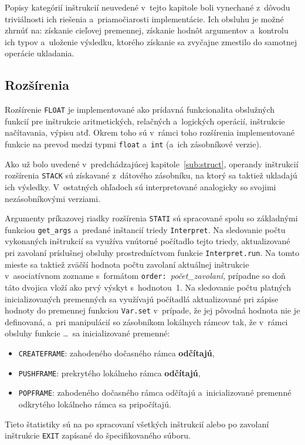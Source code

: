 \documentclass[a4paper, 10pt, twocolumn]{article}
\begin{document}
        Popisy kategórií inštrukcií neuvedené v~tejto kapitole boli vynechané z~dôvodu triviálnosti ich riešenia a~priamočiarosti implementácie. Ich obsluhu je možné zhrnúť na: získanie cieľovej premennej, získanie hodnôt argumentov a~kontrolu ich typov a~uloženie výsledku, ktorého získanie sa zvyčajne zmestilo do samotnej operácie ukladania.
    
    \subsection{Rozšírenia}
        Rozšírenie \texttt{FLOAT} je implementované ako prídavná funkcionalita obslužných funkcií pre inštrukcie aritmetických, relačných a~logických operácií, inštrukcie načítavania, výpisu atď. Okrem toho sú v~rámci toho rozšírenia implementované funkcie na prevod medzi typmi \texttt{float} a~\texttt{int} (a~ich zásobníkové verzie).
        
        Ako už bolo uvedené v~predchádzajúcej kapitole~\ref{sub:struct}, operandy inštrukcií rozšírenia \texttt{STACK} sú získavané z~dátového zásobníku, na ktorý sa taktiež ukladajú ich výsledky. V~ostatných ohľadoch sú interpretované analogicky so svojimi nezásobníkovými verziami.
        
        Argumenty príkazovej riadky rozšírenia \texttt{STATI} sú spracované spolu so základnými funkciou \texttt{get\_args} a~predané inštancií triedy \texttt{Interpret}. Na sledovanie počtu vykonaných inštrukcií sa využíva vnútorné počítadlo tejto triedy, aktualizované pri zavolaní príslušnej obsluhy prostredníctvom funkcie \texttt{Interpret.run}. Na tomto mieste sa taktiež zväčší hodnota počtu zavolaní aktuálnej inštrukcie v~asociatívnom zozname s~formátom \texttt{order:}~\textit{počet\_zavolaní}, prípadne so doň táto dvojica vloží ako prvý výskyt s~hodnotou~1. Na sledovanie počtu platných inicializovaných premenných sa využívajú počítadlá aktualizované pri zápise hodnoty do premennej funkciou \texttt{Var.set} v~prípade, že jej pôvodná hodnota nie je definovaná, a~pri manipulácií so zásobníkom lokálnych rámcov tak, že v~rámci obsluhy funkcie \dots~sa inicializované premenné:
        \begin{itemize}
            \item \texttt{CREATEFRAME}: zahodeného dočasného rámca \textbf{odčítajú},
            \item \texttt{PUSHFRAME}: prekrytého lokálneho rámca \textbf{odčítajú},
            \item \texttt{POPFRAME}: zahodeného dočasného rámca odčítajú a~inicializované premenné odkrytého lokálneho rámca sa pripočítajú.
        \end{itemize}
        Tieto štatistiky sú na po spracovaní všetkých inštrukcií alebo po zavolaní inštrukcie \texttt{EXIT} zapísané do špecifikovaného súboru.
\end{document}

